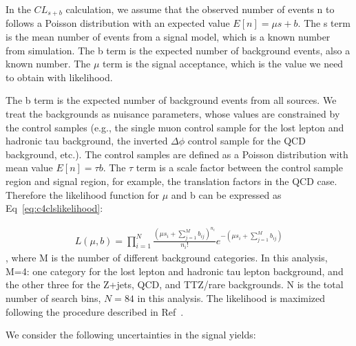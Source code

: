 In the $CL_{s+b}$ calculation, we assume that the observed number of events n to follows a Poisson distribution with an expected value $E[n]=\mu s+b$. The s term is the mean number of events from a signal model, which is a known number from simulation. The b term is the expected number of background events, also a known number. The $\mu$ term is the signal acceptance, which is the value we need to obtain with likelihood. 

The b term is the expected number of background events from all sources. We treat the backgrounds as nuisance parameters, whose values are constrained by the control samples (e.g., the single muon control sample for the lost lepton and hadronic tau background, the inverted $\Delta \phi$ control sample for the QCD background, etc.). The control samples are defined as a Poisson distribution with mean value $E[n]=\tau b$. The $\tau$ term is a scale factor between the control sample region and signal region, for example, the translation factors in the QCD case. Therefore the likelihood function for $\mu$ and b can be expressed as Eq~\ref{eq:c4clslikelihood}:

\begin{equation}
 \begin{aligned}
	 L(\mu,b)= \prod_{i=1}^{N} \frac{(\mu s_{i}+\sum_{j=1}^{M}b_{ij})^{n_{i}}}{n_{i}!}e^{-(\mu s_{i}+\sum_{j=1}^{M}b_{ij})}
 \end{aligned}
 \label{eq:c4clslikelihood}
\end{equation}
, where M is the number of different background categories. In this analysis, M=4: one category for the lost lepton and hadronic tau lepton background, and the other three for the Z+jets, QCD, and TTZ/rare backgrounds. N is the total number of search bins, $N=84$ in this analysis. The likelihood is maximized following the procedure described in Ref~\cite{Cowan:2010js}.

We consider the following uncertainties in the signal yields: 


